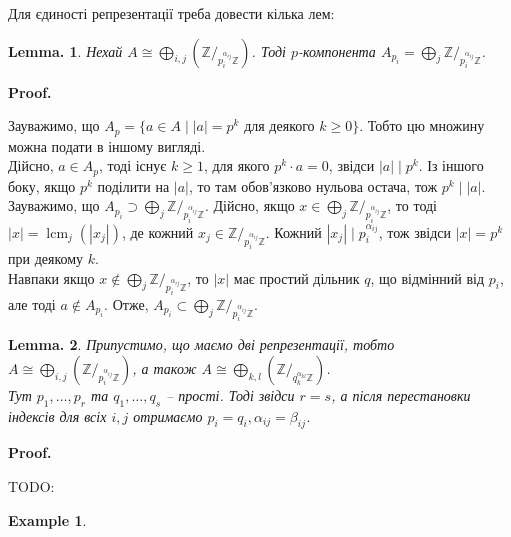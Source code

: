 \documentclass[a4paper, 10pt]{article}
\makeatletter
\theoremstyle{theoremdd}
\theoremstyle{theoremdd}
\theoremstyle{theoremdd}
\theoremstyle{theoremdd}
\theoremstyle{theoremdd}
\newtheorem{example}[theorem]{Example}
\theoremstyle{theoremdd}
\theoremstyle{theoremdd}
\newtheorem*{lemma*}{Lemma.}
\theoremstyle{theoremdd}
\theoremstyle{theoremdd}
\theoremstyle{theoremdd}
\theoremstyle{theoremdd}
\theoremstyle{theoremdd}
\theoremstyle{theoremdd}
\theoremstyle{theoremdd}
\theoremstyle{theoremdd}
\renewenvironment{proof}[1][Proof.\\]{\par
\pushQED{\hfill \qed}%
\normalfont \topsep6\p@\@plus6\p@\relax
\trivlist
\item\relax
{\bfseries
#1\@addpunct{.}}\hspace\labelsep\ignorespaces
}{%
\popQED\endtrivlist\@endpefalse
}
\DeclareMathOperator{\lcm}{lcm}
\makeatother
\begin{document}
Для єдиності репрезентації треба довести кілька лем:

\begin{lemma*}
Нехай $\displaystyle A \cong \bigoplus_{i,j} \left(\mathbb{Z}/_{p_i^{\alpha_{ij}} \mathbb{Z}}\right)$. Тоді $p$-компонента $A_{p_i} = \displaystyle\bigoplus_{j} \mathbb{Z}/_{p_i^{\alpha_{ij}} \mathbb{Z}}$.
\end{lemma*}

\begin{proof}
Зауважимо, що $A_p = \{a \in A \mid |a| = p^k \text{ для деякого } k\geq 0\}$. Тобто цю множину можна подати в іншому вигляді.\\
Дійсно, $a \in A_p$, тоді існує $k \geq 1$, для якого $p^k \cdot a = 0$, звідси $|a| \mid p^k$. Із іншого боку, якщо $p^k$ поділити на $|a|$, то там обов'язково нульова остача, тож $p^k \mid |a|$.
\bigskip \\
Зауважимо, що $A_{p_i} \supset \displaystyle\bigoplus_j \mathbb{Z}/_{p_i^{\alpha_{ij}} \mathbb{Z}}$. Дійсно, якщо $x \in \displaystyle\bigoplus_j \mathbb{Z}/_{p_i^{\alpha_{ij}} \mathbb{Z}}$, то тоді $|x| = \lcm_j(|x_j|)$, де кожний $x_j \in \mathbb{Z}/_{p_i^{\alpha_{ij}} \mathbb{Z}}$. Кожний $|x_j| \mid p_i^{\alpha_{ij}}$, тож звідси $|x| = p^k$ при деякому $k$.\\
Навпаки якщо $x \notin \displaystyle\bigoplus_j \mathbb{Z}/_{p_i^{\alpha_{ij}} \mathbb{Z}}$, то $|x|$ має простий дільник $q$, що відмінний від $p_i$, але тоді $a \notin A_{p_i}$. Отже, $A_{p_i} \subset \displaystyle\bigoplus_j \mathbb{Z}/_{p_i^{\alpha_{ij}} \mathbb{Z}}$.
\end{proof}

\begin{lemma*}
Припустимо, що маємо дві репрезентації, тобто\\
$\displaystyle A \cong \bigoplus_{i,j} \left(\mathbb{Z}/_{p_i^{\alpha_{ij}} \mathbb{Z}}\right)$, а також $\displaystyle A \cong \bigoplus_{k,l} \left(\mathbb{Z}/_{q_k^{\alpha_{kl}} \mathbb{Z}}\right)$.\\
Тут $p_1,\dots,p_r$ та $q_1,\dots,q_s$ -- прості. Тоді звідси $r = s$, а після перестановки індексів для всіх $i,j$ отримаємо $p_i = q_i, \alpha_{ij} = \beta_{ij}$.
\end{lemma*}

\begin{proof}
TODO:
\end{proof}

\begin{example}
\end{example}
\newpage
\end{document}
